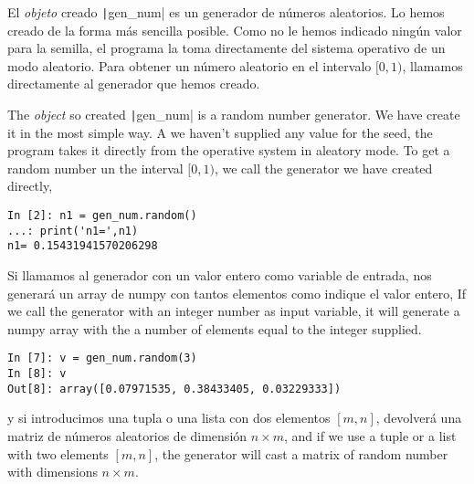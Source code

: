 \begin{paracol}{2}
El  \emph{objeto} creado \texttt|gen_num| es un generador de números aleatorios. Lo hemos creado de la forma más sencilla posible. Como no le hemos indicado ningún valor para la semilla, el programa la toma directamente del sistema operativo de un modo aleatorio. Para obtener un número aleatorio en el intervalo $[0,1)$, llamamos directamente al generador que hemos creado.

\switchcolumn
The \emph{object} so created \texttt|gen_num| is a random number generator. We have create it in the most simple way. A we haven't supplied any value for the seed, the program takes it directly from the operative system in aleatory mode. To get a random number un the interval $[0,1)$, we call the generator we have created directly, 

\end{paracol}
\begin{center}
	\begin{minipage}{0.5\textwidth}
\begin{verbatim}
In [2]: n1 = gen_num.random()
...: print('n1=',n1)
n1= 0.15431941570206298
\end{verbatim}
\end{minipage}
\end{center}
\begin{paracol}{2}
Si llamamos al generador con un valor entero como variable de entrada, nos generará un array de numpy con tantos elementos como indique el valor entero,
\switchcolumn
If we call the generator with an integer number as input variable, it will generate a numpy array with the a number of elements equal to the integer supplied.
\end{paracol}
\begin{center}
	\begin{minipage}{0.5\textwidth}
\begin{verbatim}
In [7]: v = gen_num.random(3)
In [8]: v
Out[8]: array([0.07971535, 0.38433405, 0.03229333])
\end{verbatim}
\end{minipage}
\end{center}

\begin{paracol}{2}
\noindent y si introducimos una tupla o una lista con dos elementos $[m,n]$, devolverá una matriz de números aleatorios de dimensión $n\times m$,
\switchcolumn
\noindent and if we use a tuple or a list with two elements $[m,n]$, the generator will cast a matrix of random number with dimensions $n\times m$.
\end{paracol}

